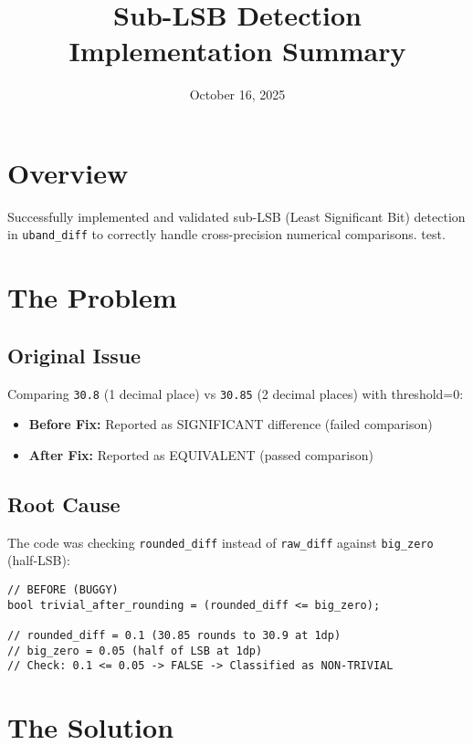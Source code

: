 \documentclass[11pt]{article}
\title{Sub-LSB Detection Implementation Summary}
\author{}
\date{October 16, 2025}
\begin{document}
\maketitle

\section{Overview}

Successfully implemented and validated sub-LSB (Least Significant Bit) detection in \texttt{uband\_diff} to correctly handle cross-precision numerical comparisons.
test.

\section{The Problem}

\subsection{Original Issue}

Comparing \texttt{30.8} (1 decimal place) vs \texttt{30.85} (2 decimal places) with threshold=0:

\begin{itemize}
    \item \textbf{Before Fix:} Reported as SIGNIFICANT difference (failed comparison)
    \item \textbf{After Fix:} Reported as EQUIVALENT (passed comparison)
\end{itemize}

\subsection{Root Cause}

The code was checking \texttt{rounded\_diff} instead of \texttt{raw\_diff} against \texttt{big\_zero} (half-LSB):

\begin{lstlisting}
// BEFORE (BUGGY)
bool trivial_after_rounding = (rounded_diff <= big_zero);

// rounded_diff = 0.1 (30.85 rounds to 30.9 at 1dp)
// big_zero = 0.05 (half of LSB at 1dp)
// Check: 0.1 <= 0.05 -> FALSE -> Classified as NON-TRIVIAL
\end{lstlisting}

\section{The Solution}
\end{document}
